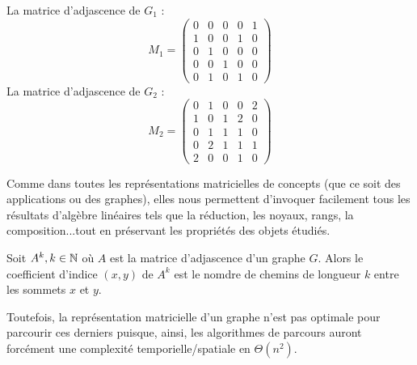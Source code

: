 \begin{example}
    \begin{multicols}{2}
        La matrice d'adjascence de $G_1$ :
        \[ M_1 = 
        \begin{pmatrix}
            0 & 0 & 0 & 0 & 1 \\
            1 & 0 & 0 & 1 & 0 \\
            0 & 1 & 0 & 0 & 0 \\
            0 & 0 & 1 & 0 & 0 \\
            0 & 1 & 0 & 1 & 0 
        \end{pmatrix} \] 
        \vfill %
        \columnbreak %
        La matrice d'adjascence de $G_2$ :
        \[ M_2 = 
        \begin{pmatrix}
            0 & 1 & 0 & 0 & 2 \\
            1 & 0 & 1 & 2 & 0 \\
            0 & 1 & 1 & 1 & 0 \\
            0 & 2 & 1 & 1 & 1 \\
            2 & 0 & 0 & 1 & 0
        \end{pmatrix} \] 
    \end{multicols}
\end{example}

\begin{remark}
    Comme dans toutes les représentations matricielles de concepts (que ce soit des applications ou des graphes),
    elles nous permettent d'invoquer facilement tous les résultats d'algèbre linéaires tels que la réduction,
    les noyaux, rangs, la composition...tout en préservant les propriétés des objets étudiés.
\end{remark}

\begin{prop}
    Soit $A^k, k \in \mathbb{N}$ où $A$ est la matrice d'adjascence d'un graphe $G$.
    Alors le coefficient d'indice $(x,y)$ de $A^k$ est le nomdre de chemins de longueur $k$ entre les sommets $x$ et $y$.
\end{prop}

\begin{remark}
    Toutefois, la représentation matricielle d'un graphe n'est pas optimale pour parcourir ces derniers puisque, ainsi, 
    les algorithmes de parcours auront forcément une complexité temporielle/spatiale en $\Theta(n^2)$.
\end{remark}

